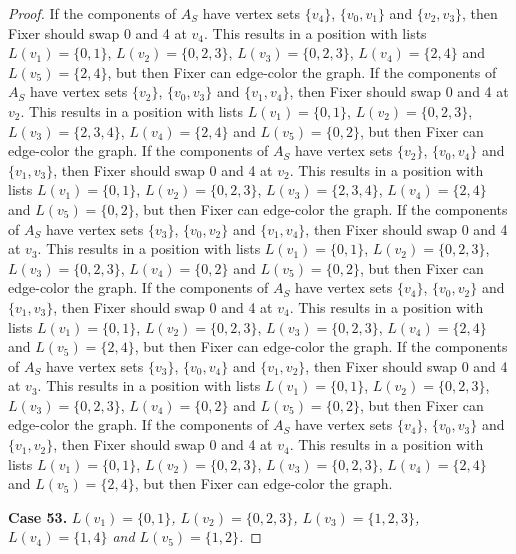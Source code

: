 \documentclass[12pt]{amsart}
\theoremstyle{plain}
\theoremstyle{definition}
\theoremstyle{remark}
\begin{document}
\begin{proof}
If the components of $A_S$ have vertex sets $\{v_4\}$, $\{v_0, v_1\}$ and $\{v_2, v_3\}$, then Fixer should swap 0 and 4 at $v_4$. This results in a position with lists $L(v_1) = \{0, 1\}$, $L(v_2) = \{0, 2, 3\}$, $L(v_3) = \{0, 2, 3\}$, $L(v_4) = \{2, 4\}$ and $L(v_5) = \{2, 4\}$, but then Fixer can edge-color the graph.
If the components of $A_S$ have vertex sets $\{v_2\}$, $\{v_0, v_3\}$ and $\{v_1, v_4\}$, then Fixer should swap 0 and 4 at $v_2$. This results in a position with lists $L(v_1) = \{0, 1\}$, $L(v_2) = \{0, 2, 3\}$, $L(v_3) = \{2, 3, 4\}$, $L(v_4) = \{2, 4\}$ and $L(v_5) = \{0, 2\}$, but then Fixer can edge-color the graph.
If the components of $A_S$ have vertex sets $\{v_2\}$, $\{v_0, v_4\}$ and $\{v_1, v_3\}$, then Fixer should swap 0 and 4 at $v_2$. This results in a position with lists $L(v_1) = \{0, 1\}$, $L(v_2) = \{0, 2, 3\}$, $L(v_3) = \{2, 3, 4\}$, $L(v_4) = \{2, 4\}$ and $L(v_5) = \{0, 2\}$, but then Fixer can edge-color the graph.
If the components of $A_S$ have vertex sets $\{v_3\}$, $\{v_0, v_2\}$ and $\{v_1, v_4\}$, then Fixer should swap 0 and 4 at $v_3$. This results in a position with lists $L(v_1) = \{0, 1\}$, $L(v_2) = \{0, 2, 3\}$, $L(v_3) = \{0, 2, 3\}$, $L(v_4) = \{0, 2\}$ and $L(v_5) = \{0, 2\}$, but then Fixer can edge-color the graph.
If the components of $A_S$ have vertex sets $\{v_4\}$, $\{v_0, v_2\}$ and $\{v_1, v_3\}$, then Fixer should swap 0 and 4 at $v_4$. This results in a position with lists $L(v_1) = \{0, 1\}$, $L(v_2) = \{0, 2, 3\}$, $L(v_3) = \{0, 2, 3\}$, $L(v_4) = \{2, 4\}$ and $L(v_5) = \{2, 4\}$, but then Fixer can edge-color the graph.
If the components of $A_S$ have vertex sets $\{v_3\}$, $\{v_0, v_4\}$ and $\{v_1, v_2\}$, then Fixer should swap 0 and 4 at $v_3$. This results in a position with lists $L(v_1) = \{0, 1\}$, $L(v_2) = \{0, 2, 3\}$, $L(v_3) = \{0, 2, 3\}$, $L(v_4) = \{0, 2\}$ and $L(v_5) = \{0, 2\}$, but then Fixer can edge-color the graph.
If the components of $A_S$ have vertex sets $\{v_4\}$, $\{v_0, v_3\}$ and $\{v_1, v_2\}$, then Fixer should swap 0 and 4 at $v_4$. This results in a position with lists $L(v_1) = \{0, 1\}$, $L(v_2) = \{0, 2, 3\}$, $L(v_3) = \{0, 2, 3\}$, $L(v_4) = \{2, 4\}$ and $L(v_5) = \{2, 4\}$, but then Fixer can edge-color the graph.

\noindent\textbf{Case 53.  }\textit{$L(v_1) = \{0, 1\}$, $L(v_2) = \{0, 2, 3\}$, $L(v_3) = \{1, 2, 3\}$, $L(v_4) = \{1, 4\}$ and $L(v_5) = \{1, 2\}$.}


\end{proof}
\end{document}
